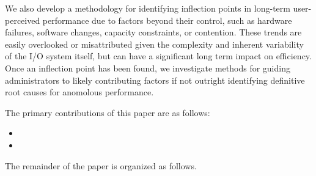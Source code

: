 We also develop a methodology for identifying inflection points in
long-term user-perceived performance due to factors beyond their control,
such as hardware failures, software changes, capacity constraints, or
contention.  These trends are easily overlooked or misattributed given the
complexity and inherent variability of the I/O system itself, but can have a
significant long term impact on efficiency.  Once an inflection point has
been found, we investigate methods for guiding administrators to likely
contributing factors if not outright identifying definitive root causes for
anomolous performance.


The primary contributions of this paper are as follows:
\begin{itemize}
\item {}
\item {}
\end{itemize}

The remainder of the paper is organized as follows.  
